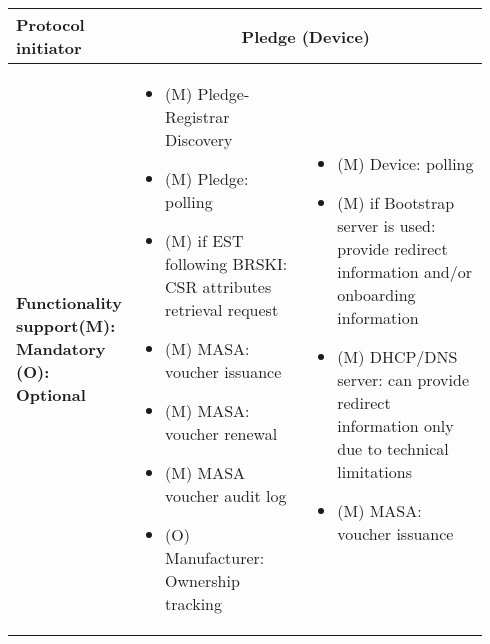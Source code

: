 \begin{longtable}{|m{0.171\linewidth}|m{0.372\linewidth}|m{0.393\linewidth}|}
		\hline
		\rowcolor[rgb]{ .745,  .804,  .843} \textbf{Protocol initiator} & \multicolumn{2}{c|}{\cellcolor[rgb]{ 1,  1,  1}Pledge (Device)} \bigstrut\\

		\hline
		\rowcolor[rgb]{ .745,  .804,  .843}\textbf{Functionality support\newline{}(M): Mandatory\newline{}	(O): Optional} 
			& \multicolumn{1}{p{18.335em}|}{\cellcolor[rgb]{ 1,  1,  1} 
			\begin{itemize}[leftmargin=*,topsep=0pt, noitemsep]
			\item
				(M) Pledge-Registrar Discovery
			\item
				(M) Pledge: polling
			\item
				(M) if EST following BRSKI: CSR attributes retrieval request
			\item
				(M) MASA: voucher issuance
			\item
				(M) MASA: voucher renewal
			\item
				(M) MASA voucher audit log
			\item
				(O) Manufacturer: Ownership tracking
			\end{itemize}
		}
		& \multicolumn{1}{p{18.335em}|}{\cellcolor[rgb]{ 1,  1,  1}
			\begin{itemize}[leftmargin=*, topsep=0pt, noitemsep]
			\item
			(M) Device: polling
			\item
			(M) if Bootstrap server is used: provide redirect information and/or onboarding information
			\item
			(M) DHCP/DNS server: can provide redirect information only due to technical limitations
			\item
			(M) MASA: voucher issuance
			\end{itemize}
		} \bigstrut\\


\end{longtable}
